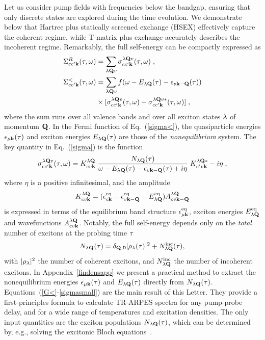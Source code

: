 \documentclass[twocolumn,aps,a4paper,superscriptaddress]{revtex4-2}
\begin{document}
Let us consider  pump fields with frequencies
below the bandgap, ensuring that only discrete states are
explored during the time evolution.
We demonstrate below that Hartree plus statically
screened exchange (HSEX) effectively capture
the coherent regime, while T-matrix plus exchange
accurately describes the incoherent regime.
Remarkably, the full self-energy can be compactly
expressed as
\begin{subequations}
\begin{align}
\Sigma^{R}_{cc'{\mathbf k}}(\tau,\omega)&=\sum_{\lambda{\mathbf Q} v}\sigma^{\lambda{\mathbf Q}
v}_{cc'{\mathbf k}}(\tau,\omega)\;,
\label{sigmaR}
\\
\Sigma^{<}_{cc'{\mathbf k}}(\tau,\omega)&=\sum_{\lambda{\mathbf Q} v}
f(\omega-E_{\lambda{\mathbf Q}}(\tau)-\epsilon_{v{\mathbf k}-{\mathbf Q}}(\tau))
\nonumber\\
&\times[\sigma^{\lambda{\mathbf Q} v}_{cc'{\mathbf k}}(\tau,\omega)-\sigma^{\lambda{\mathbf Q}
v\ast}_{cc'{\mathbf k}}(\tau,\omega)]\;,
\label{sigma<}
\end{align}
\label{sigma}
\end{subequations}
where the sum runs over all valence bands and over all exciton states $\lambda$ of
momentum ${\mathbf Q}$. In the Fermi function of Eq.~(\ref{sigma<}),
the quasiparticle energies
$\epsilon_{\mu{\mathbf k}}(\tau)$ and exciton energies $E_{\lambda{\mathbf Q}}(\tau)$ are those of
the {\em nonequilibrium} system.
The key quantity in Eq.~(\ref{sigma}) is the function
\begin{align}
\sigma^{\lambda{\mathbf Q} v}_{cc'{\mathbf k}}(\tau,\omega)=K^{\lambda{\mathbf Q}}_{cv{\mathbf k}}\;
\frac{N_{\lambda{\mathbf Q}}(\tau)}{\omega-E_{\lambda{\mathbf Q}}(\tau)-\epsilon_{v{\mathbf k}-{\mathbf Q}}(\tau)+i\eta}\;
K^{\lambda{\mathbf Q}\ast}_{c'v{\mathbf k}}-i\eta\;,
\label{sigmasmall}
\end{align}
where $\eta$ is a positive infinitesimal, and the amplitude
\begin{align}
K^{\lambda{\mathbf Q}}_{cv{\mathbf k}}=(\epsilon^{\rm eq}_{c{\mathbf k}}-\epsilon^{\rm eq}_{v{\mathbf k}-{\mathbf Q}}-E^{\rm eq}_{\lambda{\mathbf Q}})A^{\lambda
{\mathbf Q}}_{cv{\mathbf k}-{\mathbf Q}}
\label{contrdef}
\end{align}
is expressed in terms of the
equilibrium band structure $\epsilon^{\rm eq}_{\mu{\mathbf k}}$,
exciton energies $E^{\rm eq}_{\lambda{\mathbf Q}}$ and wavefunctions $A^{\lambda
{\mathbf Q}}_{cv{\mathbf k}}$. Notably, the full self-energy
depends only on the {\em total} number of
excitons at the probing time $\tau$~\cite{stefanucci_excitonic_2025}
\begin{align}
N_{\lambda{\mathbf Q}}(\tau)=\delta_{{\mathbf Q},\mathbf 0}|\rho_{\lambda}(\tau)|^{2}+
N^{\rm inc}_{\lambda{\mathbf Q}}(\tau),
\label{N=c+ixb}
\end{align}
with $|\rho_{\lambda}|^{2}$ the number of coherent excitons,
and $N^{\rm inc}_{\lambda{\mathbf Q}}$ the number of incoherent
excitons.
In Appendix~\ref{findensapp} we present a
practical method to extract the nonequilibrium energies
$\epsilon_{\mu{\mathbf k}}(\tau)$ and $E_{\lambda{\mathbf Q}}(\tau)$
directly from $N_{\lambda{\mathbf Q}}(\tau)$.
Equations~(\ref{G<}-\ref{sigmasmall}) are the main
result of this Letter. They
 provide a first-principles formula
to calculate TR-ARPES spectra for any pump-probe delay, and for a
wide range of temperatures and excitation densities.
The only input quantities are
the exciton
populations $N_{\lambda{\mathbf Q}}(\tau)$, which
can be determined by, e.g., solving the excitonic Bloch
equations~\cite{thranhardt_quantum_2000,selig_exciton_2016,brem_exciton_2018,stefanucci_excitonic_2025}.
\end{document}
